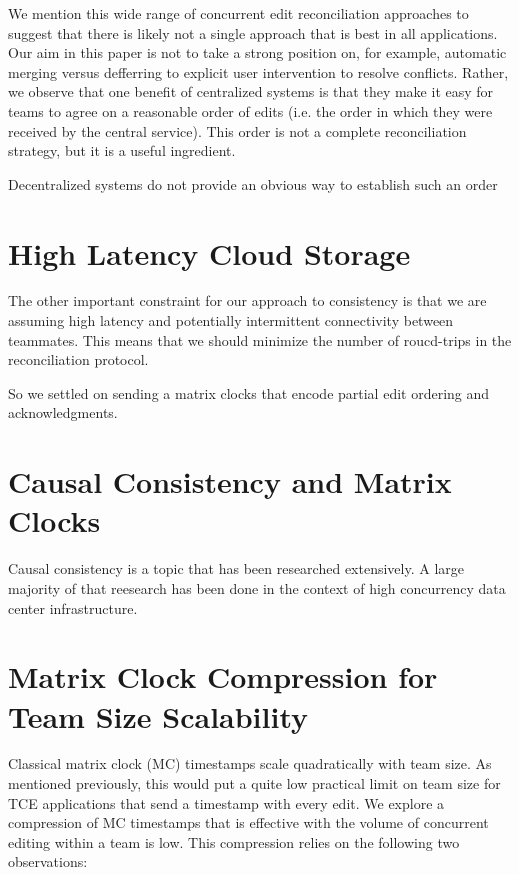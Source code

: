 \documentclass[runningheads]{llncs}
\begin{document}
We mention this wide range of concurrent edit reconciliation approaches to suggest that there is likely not a single approach that is best in all applications.
Our aim in this paper is not to take a strong position on, for example, automatic merging versus defferring to explicit user intervention to resolve conflicts.
Rather, we observe that one benefit of centralized systems is that they make it easy for teams to agree on a reasonable order of edits (i.e. the order in which they were received by the central service).
This order is not a complete reconciliation strategy, but it is a useful ingredient.

Decentralized systems do not provide an obvious way to establish such an order

\section{High Latency Cloud Storage}

The other important constraint for our approach to consistency is that we are assuming high latency and potentially intermittent connectivity between teammates.
This means that we should minimize the number of roucd-trips in the reconciliation protocol.

So we settled on sending a matrix clocks that encode partial edit ordering and acknowledgments.

\section{Causal Consistency and Matrix Clocks}

Causal consistency is a topic that has been researched extensively.
A large majority of that reesearch has been done in the context of high concurrency data center infrastructure.


\section{Matrix Clock Compression for Team Size Scalability}

Classical matrix clock (MC) timestamps scale quadratically with team size.
As mentioned previously, this would put a quite low practical limit on team size for TCE applications that send a timestamp with every edit.
We explore a compression of MC timestamps that is effective with the volume of concurrent editing within a team is low.
This compression relies on the following two observations:
\end{document}
